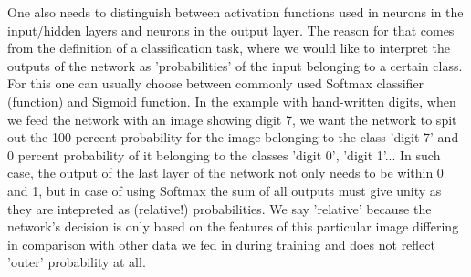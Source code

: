 One also needs to distinguish between activation functions used in neurons in the input/hidden layers and neurons in the output layer. The reason for that comes from the definition of a classification task, where we would like to interpret the outputs of the network as 'probabilities' of the input belonging to a certain class. For this one can usually choose between commonly used Softmax classifier (function) and Sigmoid function. In the example with hand-written digits, when we feed the network with an image showing digit 7, we want the network to spit out the 100 percent probability for the image belonging to the class 'digit 7' and 0 percent probability of it belonging to the classes 'digit 0', 'digit 1'... In such case, the output of the last layer of the network not only needs to be within 0 and 1, but in case of using Softmax the sum of all outputs must give unity as they are intepreted as (relative!) probabilities. We say 'relative' because the network's decision is only based on the features of this particular image differing in comparison with other data we fed in during training and does not reflect 'outer' probability at all. 

